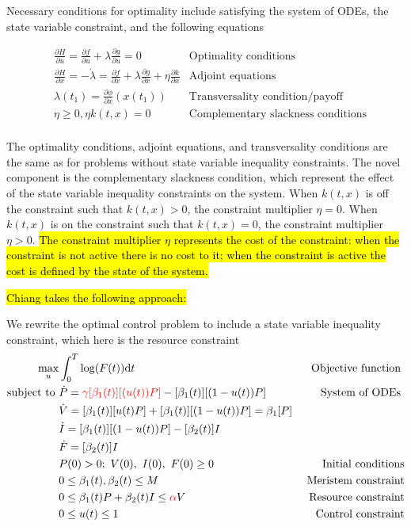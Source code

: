 \documentclass[12pt, oneside]{article}   	%
\begin{document}
Necessary conditions for optimality include satisfying the system of ODEs, the state variable constraint, and the following equations

\begin{align}
& \frac{\partial H}{\partial u}  = \frac{\partial f}{\partial u} + \lambda \frac{\partial g}{\partial u} = 0  & \mbox{Optimality conditions} \nonumber \\
 & \frac{\partial H}{\partial x}  = - \dot{\lambda} = \frac{\partial f}{\partial x} + \lambda \frac{\partial g}{\partial x} + \eta \frac{\partial k}{\partial x} & \mbox{Adjoint equations} \nonumber \\
& \lambda(t_1)  = \frac{\partial \phi}{\partial x}  (x(t_1))  & \mbox{Transversality condition/payoff} \nonumber \\
& \eta \geq 0, \eta k(t,x) = 0  & \mbox{Complementary slackness conditions} \nonumber \\
\end{align}

The optimality conditions, adjoint equations, and transversality conditions are the same as for problems without state variable inequality constraints. The novel component is the complementary slackness condition, which represent the effect of the state variable inequality constraints on the system. When $k(t,x)$ is off the constraint such that $k(t,x)>0$, the constraint multiplier $\eta = 0$. When $k(t,x)$ is on the constraint such that $k(t,x)=0$, the constraint multiplier $\eta > 0$. \hl{The constraint multiplier $\eta$ represents the cost of the constraint: when the constraint is not active there is no cost to it; when the constraint is active the cost is defined by the state of the system.}

\hl{Chiang takes the following approach:}

We rewrite the optimal control problem to include a state variable inequality constraint, which here is the resource constraint
%
\begin{align}
\max_{u} &  \int_0^T  \log( F(t) ) \dd t & \mbox{ Objective function }   \nonumber \\
\mathrm{subject\ to\ } 
& \dot{P} =  \textcolor{red}{\gamma [\beta_1(t)] [( u(t)) P ] }- [\beta_1(t)] [(1 - u(t)) P ] & \mbox{ System of ODEs }   \nonumber \\
& \dot{V} = [\beta_1(t)] [ u(t) P]  + [\beta_1(t)] [(1 - u(t)) P] = \beta_1 [P] \nonumber \\ 
& \dot{I} = [\beta_1(t)] [( 1-u(t) ) P] - [\beta_2(t)] I  \\ 
& \dot{F} = [\beta_2(t)] I  \nonumber \\ 
& P(0) > 0;\ V(0),\ I(0),\ F(0) \geq 0 & \mbox{ Initial conditions}  \nonumber \\
& 0 \le \beta_1(t), \beta_2(t) \le M & \mbox{ Meristem constraint}  \nonumber \\
& 0 \le \beta_1(t) P + \beta_2(t) I \le \textcolor{red}{\alpha} V & \mbox{ Resource constraint} \nonumber \\
& 0 \leq u(t) \leq 1 & \mbox{Control constraint} \nonumber 
\end{align}
\end{document}
